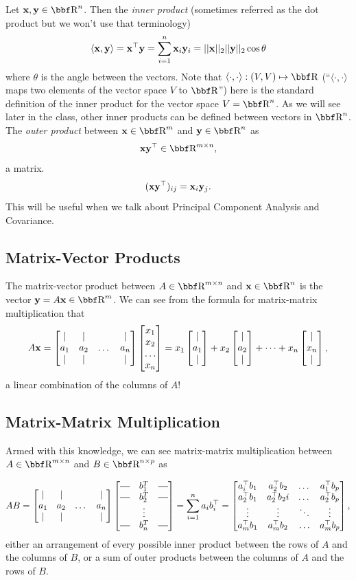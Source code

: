 \documentclass{article}
\newcommand*{\horzbar}{\rule[.5ex]{2.5ex}{0.5pt}}
\begin{document}
Let $\xx,\yy\in\RR^n$. Then the \textit{inner product} (sometimes referred as the
dot product but we won't use that terminology)
\[
    \langle {\bf x},{\bf y} \rangle = {\bf x}^\top{\bf y} = \sum_{i=1}^n {\bf x}_i{\bf y}_i = ||{\bf x}||_2||{\bf y}||_2\cos\theta
\]
where $\theta$ is the angle between the vectors.
Note that $\langle \cdot, \cdot \rangle: (V,V) \mapsto \RR$ (``$\langle \cdot, \cdot
\rangle$ maps two elements of the vector space $V$ to $\RR$'') here is the standard definition of
the inner product for the vector space $V=\RR^n$. As we will see later in the
class, other inner products can be defined between vectors in $\RR^n$.\\

The \textit{outer product} between $\xx\in\RR^m$ and $\yy\in\RR^n$ as
\[
    \xx\yy^\T \in \RR^{m\times n},
\]
a matrix.
\[
    ({\bf x}{\bf y}^\top)_{ij} = {\bf x}_i{\bf y}_j.
\]
This will be useful when we talk about Principal Component Analysis and
Covariance.

\subsection{Matrix-Vector Products}

The matrix-vector product between $A\in\RR^{m\times n}$ and $\xx\in\RR^n$ is
the vector $\yy = A\xx \in \RR^m$. We can see from the formula for matrix-matrix
multiplication that
\[
    A{\bf x} = \begin{bmatrix} |&|& &|\\a_1&a_2&\dots&a_n\\|&|& &| \end{bmatrix}\begin{bmatrix} x_1\\x_2\\\dots\\x_n \end{bmatrix} = x_1\begin{bmatrix} |\\a_1\\| \end{bmatrix} + x_2\begin{bmatrix} |\\a_2\\| \end{bmatrix} + \dots + x_n\begin{bmatrix} |\\x_n\\| \end{bmatrix},
\]
a linear combination of the columns of $A$!

\subsection{Matrix-Matrix Multiplication}

Armed with this knowledge, we can see matrix-matrix multiplication between
$A\in\RR^{m\times n}$ and $B\in\RR^{n\times p}$ as

\[
    AB = \m{|&|& &|\\a_1&a_2&\dots&a_n\\|&|& &|}\m{\horzbar&b_1^T&\horzbar\\\horzbar&b_2^T&\horzbar\\&\vdots&\\\horzbar&b_n^T&\horzbar} = \sum_{i=1}^n a_ib_i^\T = \m{a_i^\T b_1&a_2^\T b_2&\dots&a_1^\T b_p\\a_2^\T b_1& a_2^\T b_2i& \dots& a_2^\T b_p\\ \vdots & \vdots & \ddots & \vdots\\ a_m^\T b_1 & a_m^\T b_2 & \hdots & a_m^\T b_p},
\]
either an arrangement of every possible inner product between the rows of $A$
and the columns of $B$, or a sum of outer products between the columns of $A$
and the rows of $B$.
\end{document}
